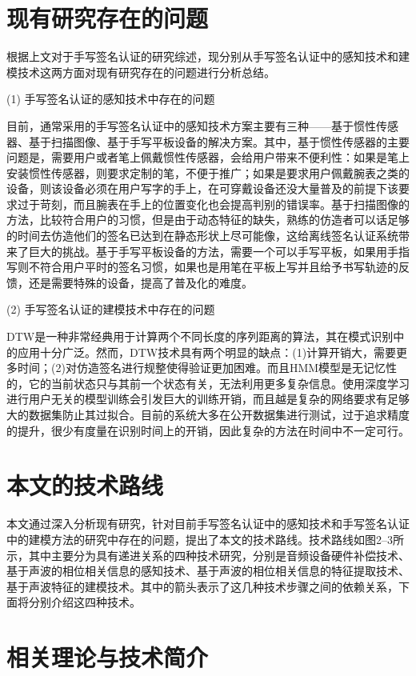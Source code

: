 \section{现有研究存在的问题}
根据上文对于手写签名认证的研究综述，现分别从手写签名认证中的感知技术和建模技术这两方面对现有研究存在的问题进行分析总结。

(1) 手写签名认证的感知技术中存在的问题

目前，通常采用的手写签名认证中的感知技术方案主要有三种——基于惯性传感器、基于扫描图像、基于手写平板设备的解决方案。其中，基于惯性传感器的主要问题是，需要用户或者笔上佩戴惯性传感器，会给用户带来不便利性：如果是笔上安装惯性传感器，则要求定制的笔，不便于推广；如果是要求用户佩戴腕表之类的设备，则该设备必须在用户写字的手上，在可穿戴设备还没大量普及的前提下该要求过于苛刻，而且腕表在手上的位置变化也会提高判别的错误率。基于扫描图像的方法，比较符合用户的习惯，但是由于动态特征的缺失，熟练的仿造者可以话足够的时间去仿造他们的签名已达到在静态形状上尽可能像，这给离线签名认证系统带来了巨大的挑战。基于手写平板设备的方法，需要一个可以手写平板，如果用手指写则不符合用户平时的签名习惯，如果也是用笔在平板上写并且给予书写轨迹的反馈，还是需要特殊的设备，提高了普及化的难度。

(2) 手写签名认证的建模技术中存在的问题

DTW是一种非常经典用于计算两个不同长度的序列距离的算法，其在模式识别中的应用十分广泛。然而，DTW技术具有两个明显的缺点：(1)计算开销大，需要更多时间；(2)对仿造签名进行规整使得验证更加困难。而且HMM模型是无记忆性的，它的当前状态只与其前一个状态有关，无法利用更多复杂信息。使用深度学习进行用户无关的模型训练会引发巨大的训练开销，而且越是复杂的网络要求有足够大的数据集防止其过拟合。目前的系统大多在公开数据集进行测试，过于追求精度的提升，很少有度量在识别时间上的开销，因此复杂的方法在时间中不一定可行。

\section{本文的技术路线}
本文通过深入分析现有研究，针对目前手写签名认证中的感知技术和手写签名认证中的建模方法的研究中存在的问题，提出了本文的技术路线。技术路线如图2–3所示，其中主要分为具有递进关系的四种技术研究，分别是音频设备硬件补偿技术、基于声波的相位相关信息的感知技术、基于声波的相位相关信息的特征提取技术、基于声波特征的建模技术。其中的箭头表示了这几种技术步骤之间的依赖关系，下面将分别介绍这四种技术。

\section{相关理论与技术简介}

